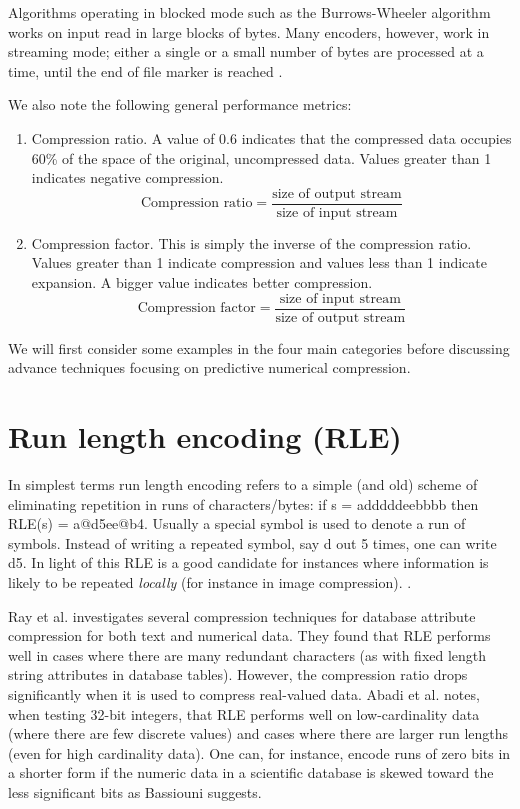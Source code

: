 \documentclass{acm_proc_article-sp}
\begin{document}
Algorithms operating in blocked mode such as the Burrows-Wheeler algorithm works on input read in large blocks of bytes. Many
encoders, however, work in streaming mode; either a single or a small number of bytes are processed at a time, until the
end of file marker is reached \cite[p. 10]{salomon2004data}.

We also note the following general performance metrics:
 \begin{enumerate}
  \item Compression ratio. A value of 0.6 indicates that the compressed data occupies 60\% of the space of the original, uncompressed
  data. Values greater than 1 indicates negative compression.
  \begin{equation}
   \mbox{Compression ratio} = \frac{\mbox{size of output stream}}{\mbox{size of input stream}} 
  \end{equation}
  \item Compression factor. This is simply the inverse of the compression ratio. Values greater than 1 indicate compression and values less
  than 1 indicate expansion. A bigger value indicates better compression.
  \begin{equation}
   \mbox{Compression factor} = \frac{\mbox{size of input stream}}{\mbox{size of output stream}} 
  \end{equation}
 \end{enumerate}
 
We will first consider some examples in the four main categories before discussing advance techniques focusing on predictive numerical compression.
\section{Run length encoding (RLE)}
In simplest terms run length encoding refers to a simple (and old) scheme of eliminating repetition in runs of characters/bytes: if s = adddddeebbbb then 
RLE(s) = a@d5ee@b4. Usually a special symbol is used to denote a run of symbols. Instead of writing a repeated symbol, say d out 5 times, one can write d5. In light of this RLE is a good candidate for 
instances where information is likely to be repeated \textit{locally} (for instance in image compression). \cite[ch 1]{salomon2004data}.

Ray et al. \cite{ray1995database} investigates several compression techniques for database attribute compression for both text and numerical data. They found that RLE performs well in cases where
there are many redundant characters (as with fixed length string attributes in database tables). However, the compression ratio drops significantly when it is used to compress
real-valued data. Abadi et al. \cite{abadi2006integrating} notes, when testing 32-bit integers, that RLE performs well on low-cardinality data (where there are few discrete values) and 
cases where there are larger run lengths (even for high cardinality data). One can, for instance, encode runs of zero bits in a shorter form if the
numeric data in a scientific database is skewed toward the less significant bits as Bassiouni \cite{1701920} suggests.
\end{document}

